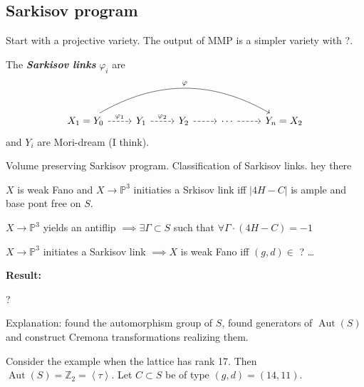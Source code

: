 \subsection{Sarkisov program}

Start with a projective variety. The output of MMP is a simpler variety with ?.

\begin{thm}\leavevmode
	The  \textit{\textbf{Sarkisov links}}  $\varphi_i$ are
	\[\begin{tikzcd}
		X_1=Y_0\arrow[r,dashed,"\varphi_1"]\arrow[rrrr,bend left,"\varphi"]&Y_1\arrow[r,dashed,"\varphi_2"]&Y_2\arrow[r,dashed]&\cdots \arrow[r,dashed]&Y_n=X_2
	\end{tikzcd}\]
	and \(Y_i\) are Mori-dream (I think).
\end{thm}

\begin{defn}\leavevmode 
\end{defn}

\begin{defn}\leavevmode
\end{defn}

Volume preserving Sarkisov program. Classification of Sarkisov links.
hey there

\begin{prop}\leavevmode
\(X\) is weak Fano and \(X \to \mathbb{P}^3\) initiaties a Srkisov link iff \(|4H-C|\) is ample and base pont free on \(S\).
\end{prop}

\begin{prop}\leavevmode
\(X \to \mathbb{P}^3\) yields an antiflip \(\implies  \exists \Gamma \subset S\) such that \(\forall \Gamma\cdot (4H-C)=-1\)
\end{prop}

\begin{prop}\leavevmode
\(X \to \mathbb{P}^3\) initiates a Sarkisov link \(\implies X \) is weak Fano iff \((g,d) \in\) ? …
\end{prop}

\textbf{Result:} 
\begin{thm}\leavevmode
?
\end{thm}
Explanation: found the automorphism group of \(S\), found generators of \(\operatorname{Aut}(S)\) and construct Cremona transformations realizing them.

Consider the example when the lattice has rank 17. Then \(\operatorname{Aut}(S)=\mathbb{Z}_2=\left<\tau\right>\). Let \(C \subset S\) be of type \((g,d)=(14,11)\).

